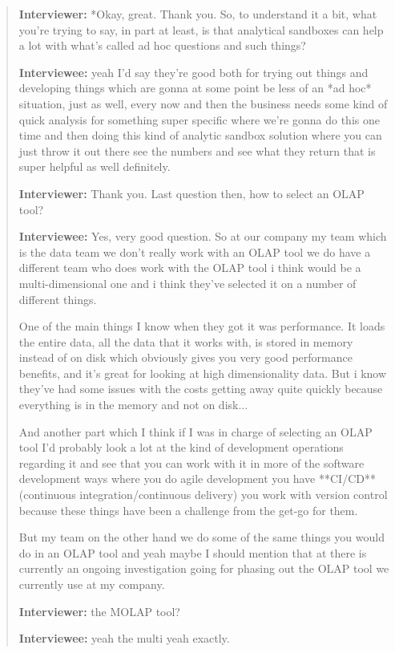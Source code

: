 \begin{quote}
    \textbf{Interviewer:} *Okay, great. Thank you. So, to understand it a bit, what you're trying to say, in part at least, is that analytical sandboxes can help a lot with what's called ad hoc questions and such things?

    \textbf{Interviewee:} yeah I'd say they're good both for trying out things and developing things which are gonna at some point be less of an *ad hoc* situation, just as well, every now and then the business needs some kind of quick analysis for something super specific where we're gonna do this one time and then doing this kind of analytic sandbox solution where you can just throw it out there see the numbers and see what they return that is super helpful as well definitely.

    \textbf{Interviewer:} Thank you. Last question then, how to select an OLAP tool?

    \textbf{Interviewee:} Yes, very good question. So at our company my team which is the data team we don't really work with an OLAP tool we do have a different team who does work with the OLAP tool i think would be a multi-dimensional one and i think they've selected it on a number of different things.

    One of the main things I know when they got it was performance. It loads the entire data, all the data that it works with, is stored in memory instead of on disk which obviously gives you very good performance benefits, and it's great for looking at high dimensionality data. 
    But i know they've had some issues with the costs getting away quite quickly because everything is in the memory and not on disk...
    
    And another part which I think if I was in charge of selecting an OLAP tool I'd probably look a lot at the kind of development operations regarding it and see that you can work with it in more of the software development ways where you do agile development you have **CI/CD** (continuous integration/continuous delivery) you work with version control because these things have been a challenge from the get-go for them.
    
    But my team on the other hand we do some of the same things you would do in an OLAP tool and yeah maybe I should mention that at there is currently an ongoing investigation going for phasing out the OLAP tool we currently use at my company.

    \textbf{Interviewer:} the MOLAP tool?

    \textbf{Interviewee:} yeah the multi yeah exactly.


\end{quote}
